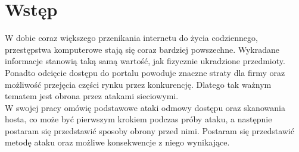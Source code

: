 \chapter*{Wstęp}
	W dobie coraz większego przenikania internetu do życia codziennego, przestępstwa komputerowe stają się coraz bardziej powszechne.
	Wykradane informacje stanowią taką samą wartość, jak fizycznie ukradzione przedmioty.
	Ponadto odcięcie dostępu do portalu powoduje znaczne straty dla firmy oraz możliwość przejęcia części rynku przez konkurencję.
	Dlatego tak ważnym tematem jest obrona przez atakami sieciowymi.\\
	W swojej pracy omówię podstawowe ataki odmowy dostępu oraz skanowania hosta, co może być pierwszym krokiem podczas próby ataku, a następnie postaram się przedstawić sposoby obrony przed nimi.
	Postaram się przedstawić metodę ataku oraz możliwe konsekwencje z niego wynikające.
